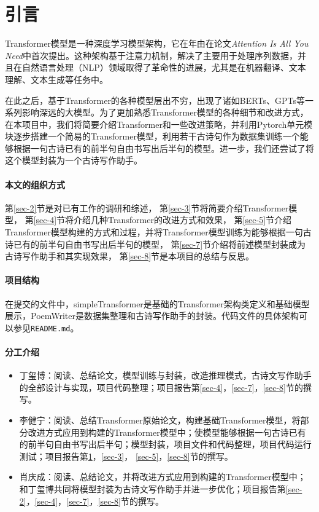 \section{引言}\label{sec-1}

Transformer模型是一种深度学习模型架构，它在\citeyear{vaswaniAttentionAllYou2023}年由\citeauthor{vaswaniAttentionAllYou2023}在论文\textit{Attention Is All You Need}中首次提出\citep{vaswaniAttentionAllYou2023}。这种架构基于注意力机制，解决了主要用于处理序列数据，并且在自然语言处理（NLP）领域取得了革命性的进展，尤其是在机器翻译、文本理解、文本生成等任务中。

在此之后，基于Transformer的各种模型层出不穷，出现了诸如BERTs、GPTs等一系列影响深远的大模型。为了更加熟悉Transformer模型的各种细节和改进方式，在本项目中，我们将简要介绍Transformer和一些改进策略，并利用Pytorch单元模块逐步搭建一个简易的Transformer模型，利用若干古诗句作为数据集训练一个能够根据一句古诗已有的前半句自由书写出后半句的模型。进一步，我们还尝试了将这个模型封装为一个古诗写作助手。

\paragraph{本文的组织方式} 
第\ref{sec-2}节是对已有工作的调研和综述，
第\ref{sec-3}节将简要介绍Transformer模型，
第\ref{sec-4}节将介绍几种Transformer的改进方式和效果，
第\ref{sec-5}节介绍Transformer模型构建的方式和过程，并将Transformer模型训练为能够根据一句古诗已有的前半句自由书写出后半句的模型，
第\ref{sec-7}节介绍将前述模型封装成为古诗写作助手和其实现效果，
第\ref{sec-8}节是本项目的总结与反思。

\paragraph{项目结构}

在提交的文件中，simpleTransformer是基础的Transformer架构类定义和基础模型展示，PoemWriter是数据集整理和古诗写作助手的封装。代码文件的具体架构可以参见\texttt{README.md}。

\paragraph{分工介绍}
\begin{itemize}
    \item 丁玺博：阅读、总结论文，模型训练与封装，改造推理模式，古诗文写作助手的全部设计与实现，项目代码整理；项目报告第\ref{sec-4}，\ref{sec-7}，\ref{sec-8}节的撰写。
    \item 李健宁：阅读、总结Transformer原始论文\cite{vaswaniAttentionAllYou2023}，构建基础Transformer模型，将部分改进方式应用到构建的Transformer模型中；使模型能够根据一句古诗已有的前半句自由书写出后半句；模型封装，项目文件和代码整理，项目代码运行测试；项目报告第\ref{sec-1}，\ref{sec-3}， \ref{sec-5}，\ref{sec-8}节的撰写。
    \item 肖庆成：阅读、总结论文，并将改进方式应用到构建的Transformer模型中；和丁玺博共同将模型封装为古诗文写作助手并进一步优化；项目报告第\ref{sec-2}，\ref{sec-4}，\ref{sec-7}，\ref{sec-8}节的撰写。
\end{itemize}



